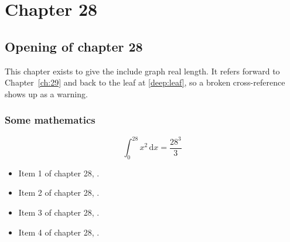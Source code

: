 \chapter{Chapter 28}
\label{ch:28}
\section{Opening of chapter 28}
This chapter exists to give the include graph real length. It refers
forward to Chapter~\ref{ch:29} and back to the leaf
at \ref{deep:leaf}, so a broken cross-reference shows up as a warning.

\subsection{Some mathematics}
\begin{equation}
  \int_0^{28} x^{2} \, \mathrm{d}x = \frac{28^{3}}{3}
\end{equation}

\begin{itemize}
  \item Item 1 of chapter 28, .
  \item Item 2 of chapter 28, .
  \item Item 3 of chapter 28, .
  \item Item 4 of chapter 28, .
\end{itemize}
